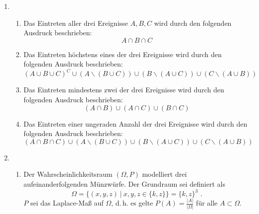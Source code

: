 \documentclass[a4paper]{scrartcl}
\begin{document}
\begin{enumerate}[label=\bfseries\arabic*.]
    \item
        \begin{enumerate}[label=(\alph*)]
            \item
                Das Eintreten aller drei Ereignisse $A, B, C$ wird durch
                den folgenden Ausdruck beschrieben:
                \begin{equation}
                    A \cap B \cap C
                \end{equation}

            \item
                Das Eintreten höchstens eines der drei Ereignisse wird durch
                den folgenden Ausdruck beschrieben:
                \begin{equation}
                    (A \cup B \cup C)^C
                    \cup (A \backslash (B \cup C))
                    \cup (B \backslash (A \cup C))
                    \cup (C \backslash (A \cup B))
                \end{equation}

            \item
                Das Eintreten mindestens zwei der drei Ereignisse wird durch
                den folgenden Ausdruck beschrieben:
                \begin{equation}
                    (A \cap B) \cup (A \cap C) \cup (B \cap C)
                \end{equation}

            \item
                Das Eintreten einer ungeraden Anzahl der drei Ereignisse wird
                durch den folgenden Ausdruck beschrieben:
                \begin{equation}
                    (A \cap B \cap C)
                    \cup (A \backslash (B \cup C))
                    \cup (B \backslash (A \cup C))
                    \cup (C \backslash (A \cup B))
                \end{equation}

        \end{enumerate}

    \item
        \begin{enumerate}[label=(\alph*)]
            \item
                Der Wahrscheinlichkeitsraum $(\Omega, P)$ modelliert drei
                aufeinanderfolgenden Münzwürfe.
                Der Grundraum sei definiert als
                \begin{equation}
                    \Omega = \Big\{
                        (x, y, z) \ \vert\  x, y, z \in \{k, z\}
                    \Big\}
                    = \{k, z\}^3
                    \text{ .}
                \end{equation}
                $P$ sei das Laplace-Maß auf $\Omega$, d.\,h. es gelte
                $P(A) = \frac{|A|}{|\Omega|}$ für alle $A \subset \Omega$.


\end{enumerate}
\end{enumerate}
\end{document}
